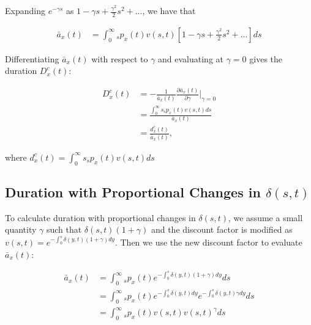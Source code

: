 \documentclass[12pt]{article}
\begin{document}
Expanding $e^{-\gamma s}$ as $1-\gamma s+\frac{\gamma^2}{2} s^{2} +...$, we have that


\begin{equation}\label{eq:DurationConstExpansion}
\begin{split}
\bar{a}_{x}(t) &= \int_0^\infty {}_sp_x(t) {v}(s,t)[1-\gamma s+\frac{\gamma^2}{2} s^{2} +...]ds
\end{split}
\end{equation}

Differentiating $\bar{a}_{x}(t)$ with respect to $\gamma$ and evaluating at $\gamma=0$ gives the duration ${D}^{c}_x(t)$:


\begin{equation}\label{eq:DurationConst2}
\begin{split}
{D}^{c}_x(t)&=-\frac{1}{\bar{a}_x(t)}\frac{\partial \bar{a}_x(t)}{\partial \gamma} \bigg\rvert_{\gamma=0}\\
              &= \frac{\int_0^\infty s {}_sp_x(t) {v}(s,t)ds}{\bar{a}_x(t)} \\
              &= \frac{{d}^{c}_x(t)}{\bar{a}_x(t)},
\end{split}
\end{equation}

where ${d}^{c}_x(t)=\int_0^\infty s {}_sp_x(t) {v}(s,t)ds$



\subsection{Duration with Proportional Changes in $\delta(s,t)$} \label{sec:DurProp}

To calculate duration with proportional changes in $\delta(s,t)$, we assume a small quantity $\gamma$ such that $\delta(s,t)(1+\gamma)$ and the discount factor is modified as ${v}(s,t)=e^{-\int_0^{s}  \delta(y,t)(1+\gamma)dy}$. Then we use the new discount factor to evaluate $\bar{a} _x(t)$: 


\begin{equation}\label{eq:DurationProp1}
\begin{split}
\bar{a} _x(t) &= \int_0^\infty {}_sp_x(t) e^{-\int_0^{s}\delta(y,t)(1+\gamma)dy}ds \\
&= \int_0^\infty {}_sp_x(t) e^{-\int_0^{s}\delta(y,t)dy}e^{-\int_0^{s}\delta(y,t)\gamma dy}ds \\
&= \int_0^\infty {}_sp_x(t) v(s,t)v(s,t)^{\gamma}ds \\
\end{split}
\end{equation}
\end{document}

